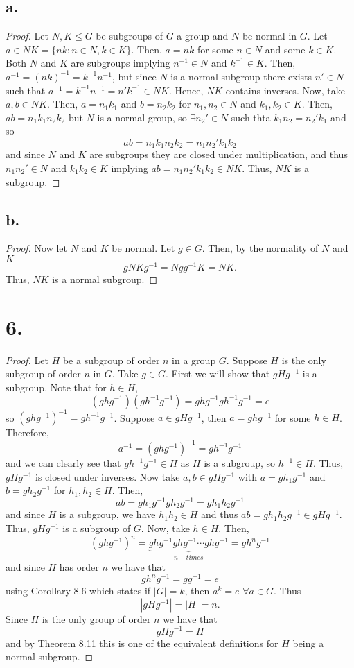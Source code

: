 \documentclass{article}
\begin{document}
\subsection*{a.}
\begin{proof}
Let $N, K \leq G$ be subgroups of $G$ a group and $N$ be normal in $G$. Let $a \in NK = \{nk : n \in N, k \in K\}$. Then, $a = nk$ for some $n \in N$ and some $k \in K$. Both $N$ and $K$ are subgroups implying $n^{-1} \in N$ and $k^{-1} \in K$. Then, $a^{-1} = (nk)^{-1} = k^{-1}n^{-1}$, but since $N$ is a normal subgroup there exists $n' \in N$ such that $a^{-1} = k^{-1}n^{-1} = n'k^{-1} \in NK$. Hence, $NK$ contains inverses. Now, take $a, b \in NK$. Then, $a = n_1k_1$ and $b = n_2k_2$ for $n_1, n_2 \in N$ and $k_1, k_2 \in K$. Then, $ab = n_1k_1n_2k_2$ but $N$ is a normal group, so $\exists n_2' \in N$ such thta $k_1n_2 = n_2'k_1$ and so \[
 ab = n_1k_1n_2k_2 = n_1n_2'k_1k_2   
\]
and since $N$ and $K$ are subgroups they are closed under multiplication, and thus $n_1n_2' \in N$ and $k_1k_2 \in K$ implying $ab = n_1n_2'k_1k_2 \in NK$. Thus, $NK$ is a subgroup. 
\end{proof}
\subsection*{b.}
\begin{proof}
    Now let $N$ and $K$ be normal. Let $g \in G$. Then, by the normality of $N$ and $K$
    \[
    gNKg^{-1} = Ngg^{-1}K = NK. 
    \]
    Thus, $NK$ is a normal subgroup. 
\end{proof}

\section*{6.}
\begin{proof}
    Let $H$ be a subgroup of order $n$ in a group $G$. Suppose $H$ is the only subgroup of order $n$ in $G$. Take $g \in G$. First we will show that $gHg^{-1}$ is a subgroup. Note that for $h \in H$, 
    \[
    (ghg^{-1})(gh^{-1}g^{-1}) = ghg^{-1}gh^{-1}g^{-1} = e    
    \]
    so $(ghg^{-1})^{-1} = gh^{-1}g^{-1}$. Suppose $a \in gHg^{-1}$, then $a = ghg^{-1}$ for some $h \in H$. Therefore, \[
        a^{-1} = (ghg^{-1})^{-1} = gh^{-1}g^{-1}
        \] 
    and we can clearly see that $gh^{-1}g^{-1} \in H$ as $H$ is a subgroup, so $h^{-1} \in H$. Thus, $gHg^{-1}$ is closed under inverses. Now take $a, b \in gHg^{-1}$ with $a = gh_1g^{-1}$ and $b = gh_2g^{-1}$ for $h_1, h_2 \in H$. Then, 
    \[
    ab = gh_1g^{-1}gh_2g^{-1} = gh_1h_2g^{-1}    
    \]
    and since $H$ is a subgroup, we have $h_1h_2 \in H$ and thus $ab = gh_1h_2g^{-1} \in gHg^{-1}$. Thus, $gHg^{-1}$ is a subgroup of $G$. Now, take $h \in H$. Then, 
    \[
    (ghg^{-1})^n = \underbrace{ghg^{-1}ghg^{-1} \cdots ghg^{-1}}_{n -times} = gh^ng^{-1}   
    \]
    and since $H$ has order $n$ we have that \[
    gh^ng^{-1} = gg^{-1} = e    
    \]
    using Corollary 8.6 which states if $|G| = k$, then $a^k = e$ $\forall a \in G$. Thus \[
    |gHg^{-1}| = |H| = n.    
    \]
    Since $H$ is the only group of order $n$ we have that \[
    gHg^{-1} = H    
    \]
    and by Theorem 8.11 this is one of the equivalent definitions for $H$ being a normal subgroup. 
\end{proof}
\end{document}

